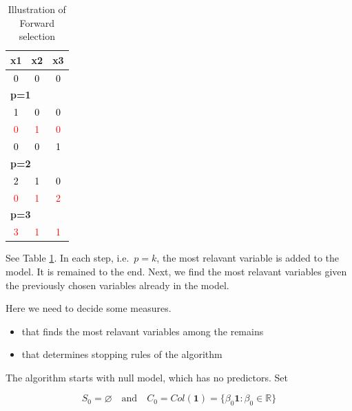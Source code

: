 \documentclass[]{book}
\providecommand{\tightlist}{%
  \setlength{\itemsep}{0pt}\setlength{\parskip}{0pt}}
\theoremstyle{definition}
\theoremstyle{definition}
\theoremstyle{definition}
\theoremstyle{remark}
\begin{document}
\begin{longtable}{c|c|c}
\caption{\label{tab:fstab}Illustration of Forward selection}\\
\hline
x1 & x2 & x3\\
\hline
\textcolor{black}{0} & \textcolor{black}{0} & \textcolor{black}{0}\\
\hline
\multicolumn{3}{l}{\textbf{p=1}}\\
\hline
\hspace{1em}\textcolor{black}{1} & \textcolor{black}{0} & \textcolor{black}{0}\\
\hline
\hspace{1em}\textcolor{red}{0} & \textcolor{red}{1} & \textcolor{red}{0}\\
\hline
\hspace{1em}\textcolor{black}{0} & \textcolor{black}{0} & \textcolor{black}{1}\\
\hline
\multicolumn{3}{l}{\textbf{p=2}}\\
\hline
\hspace{1em}\textcolor{black}{2} & \textcolor{black}{1} & \textcolor{black}{0}\\
\hline
\hspace{1em}\textcolor{red}{0} & \textcolor{red}{1} & \textcolor{red}{2}\\
\hline
\multicolumn{3}{l}{\textbf{p=3}}\\
\hline
\hspace{1em}\textcolor{red}{3} & \textcolor{red}{1} & \textcolor{red}{1}\\
\hline
\end{longtable}

See Table \ref{tab:fstab}. In each step, i.e.~\(p = k\), the most relavant variable is added to the model. It is remained to the end. Next, we find the most relavant variables given the previously chosen variables already in the model.

Here we need to decide some measures.

\begin{itemize}
\tightlist
\item
  that finds the most relavant variables among the remains
\item
  that determines stopping rules of the algorithm
\end{itemize}

The algorithm starts with null model, which has no predictors. Set

\[S_0 = \varnothing \quad \text{and} \quad C_0 = Col(\mathbf{1}) = \{ \beta_0 \mathbf{1} : \beta_0 \in \mathbb{R}\}\]
\end{document}
